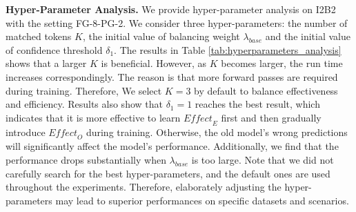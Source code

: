 \documentclass[11pt]{article}
\begin{document}
\begin{table}[htbp]
  \centering
  \caption{Hyper-parameter analysis on I2B2 (FG-8-PG-2). \textit{Mi-F1}: micro-F1; \textit{Ma-F1}: macro-F1.}
  \label{tab:hyperparameters_analysis}\end{table}

\noindent\textbf{Hyper-Parameter Analysis.}\quad
We provide hyper-parameter analysis on I2B2 with the setting FG-8-PG-2.
We consider three hyper-parameters: the number of matched tokens $K$, the initial value of balancing weight $\lambda_{base}$ and the initial value of confidence threshold $\delta_1$.
The results in Table \ref{tab:hyperparameters_analysis} shows that a larger $K$ is beneficial.
However, as $K$ becomes larger, the run time increases correspondingly.
The reason is that more forward passes are required during training.
Therefore, We select $K=3$ by default to balance effectiveness and efficiency.
Results also show that $\delta_1=1$ reaches the best result, which indicates that it is more effective to learn $\textit{Effect}_E$ first and then gradually introduce $\textit{Effect}_O$ during training.
Otherwise, the old model's wrong predictions will significantly affect the model's performance.
Additionally, we find that the performance drops substantially when $\lambda_{base}$ is too large. 
Note that we did not carefully search for the best hyper-parameters, and the default ones are used throughout the experiments.
Therefore, elaborately adjusting the hyper-parameters may lead to superior performances on specific datasets and scenarios.
\end{document}
